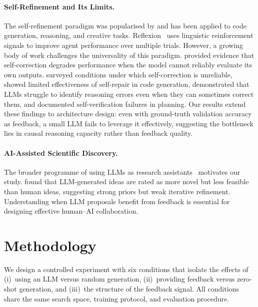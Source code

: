 \documentclass[10pt]{article}
\begin{document}
\paragraph{Self-Refinement and Its Limits.}
The self-refinement paradigm was popularised by
\citet{madaan2023selfrefine} and has been applied to code generation, reasoning,
and creative tasks.  Reflexion~\citep{shinn2023reflexion} uses linguistic
reinforcement signals to improve agent performance over multiple trials.
However, a growing body of work challenges the universality of this paradigm.
\citet{huang2024selfcorrection} provided evidence that self-correction degrades
performance when the model cannot reliably evaluate its own outputs.
\citet{kamoi2024llmselfcorrect} surveyed conditions under which self-correction
is unreliable, \citet{olausson2024selfrepair} showed limited effectiveness of
self-repair in code generation, \citet{tyen2024llms} demonstrated that LLMs
struggle to identify reasoning errors even when they can sometimes correct them,
and \citet{stechly2024selfverification} documented self-verification failures in
planning.  Our results extend these findings to architecture design: even with
ground-truth validation accuracy as feedback, a small LLM fails to leverage it
effectively, suggesting the bottleneck lies in causal reasoning capacity rather
than feedback quality.

\paragraph{AI-Assisted Scientific Discovery.}
The broader programme of using LLMs as research
assistants~\citep{lu2024aiscientist,si2024llmideas,wang2024scienceagentbench}
motivates our study.  \citet{si2024llmideas} found that LLM-generated ideas are
rated as more novel but less feasible than human ideas, suggesting strong priors
but weak iterative refinement.  Understanding when LLM proposals benefit from
feedback is essential for designing effective human--AI collaboration.

\section{Methodology}
\label{sec:method}

We design a controlled experiment with six conditions that isolate the effects
of (i)~using an LLM versus random generation, (ii)~providing feedback versus
zero-shot generation, and (iii)~the structure of the feedback signal.  All
conditions share the same search space, training protocol, and evaluation
procedure.
\end{document}
